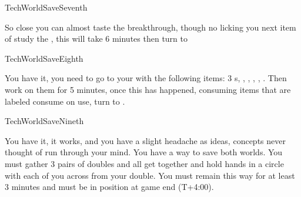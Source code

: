 \documentclass[greennotebook]{guildcamp3} %
\begin{document}
\begin{page}{TechWorldSaveSeventh}
	
	So close you can almost taste the breakthrough, though no licking you next item of study the \iMonoBlade{}, this will take 6 minutes then turn to  
	
\end{page}

\begin{page}{TechWorldSaveEighth}
	
	 You have it, you need to go to your \sTechWorkbench{} with the following items: 3 \iTFResistor{}s, \iScrapMetal{}, \iCog{}, \iCircuitBoard{}, \iFlashlight{}, \iMultitool{}. Then work on them for 5 minutes, once this has happened, consuming items that are labeled consume on use, turn to .
	
\end{page}

\begin{page}{TechWorldSaveNineth}
	
	You have it, it works, and you have a slight headache as ideas, concepts never thought of run through your mind. You have a way to save both worlds.  You must gather 3 pairs of doubles and all get together and hold hands in a circle with each of you across from your double. You must remain this way for at least 3 minutes and must be in position at game end (T+4:00).
	
\end{page}

\endnotebook
\end{document}
